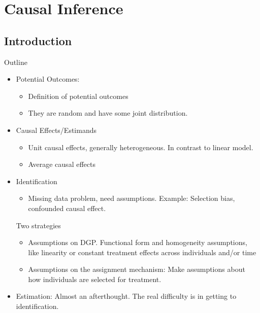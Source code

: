 \documentclass[12pt]{article}
\theoremstyle{plain}
\theoremstyle{definition}
\theoremstyle{remark}
\begin{document}
\clearpage
\section{Causal Inference}

\subsection{Introduction}

Outline
\begin{itemize}
  \item Potential Outcomes:
    \begin{itemize}
      \item Definition of potential outcomes
      \item They are random and have some joint distribution.
    \end{itemize}


  \item Causal Effects/Estimands
    \begin{itemize}
      \item Unit causal effects, generally heterogeneous.
        In contrast to linear model.
      \item Average causal effects
    \end{itemize}

  \item Identification
    \begin{itemize}
      \item Missing data problem, need assumptions.
        Example: Selection bias, confounded causal effect.
    \end{itemize}
    Two strategies
    \begin{itemize}
      \item Assumptions on DGP.
        Functional form and homogeneity assumptions, like linearity or constant treatment effects across individuals and/or time

      \item Assumptions on the assignment mechanism:
        Make assumptions about how individuals are selected for
        treatment.
    \end{itemize}

  \item
    Estimation:
    Almost an afterthought. The real difficulty is in getting to
    identification.
\end{itemize}
\end{document}
